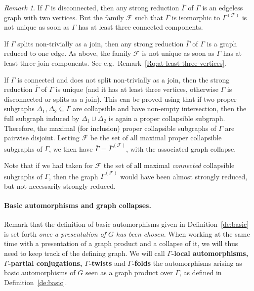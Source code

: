 \documentclass[a4paper,english,11pt]{article}
\theoremstyle{definition}
\theoremstyle{remark}
\newtheorem{rk}[de]{Remark}
\newcommand{\calf}{\mathcal{F}}
\newcommand{\deffont}[1]{\textbf{#1}}
\begin{document}
\begin{rk}\label{Rq:strong-reduction-as-at-least-3-vertices}\label{Rq:Unicite-des-reductions}
If $\Gamma$ is disconnected, then any strong reduction $\overline\Gamma$ of $\Gamma$ is an edgeless graph with two vertices. But the family $\mathcal{F}$ such that $\overline{\Gamma}$ is isomorphic to $\Gamma^{(\mathcal{F})}$ is not unique
as soon as $\Gamma$ has at least three connected components.

If $\Gamma$ splits non-trivially as a join, then any strong reduction $\overline\Gamma$ of $\Gamma$ is a graph reduced to one edge. As above, the family $\mathcal{F}$
is not unique as soon as $\Gamma$ has at least three join components. See e.g.\ Remark~\ref{Rq:at-least-three-vertices}.

If $\Gamma$ is connected and does not split non-trivially as a join, then the strong reduction $\overline{\Gamma}$ of $\Gamma$ is unique (and it has at least three vertices, otherwise $\Gamma$ is disconnected or splits as a join). This can be proved using that if two proper subgraphs $\Delta_1,\Delta_2\subseteq\Gamma$ are collapsible and have non-empty intersection, then the full subgraph induced by $\Delta_1\cup\Delta_2$ is again a proper collapsible subgraph. Therefore, the maximal (for inclusion) {proper} collapsible subgraphs of $\Gamma$ are pairwise disjoint. Letting $\calf$ be the set of all maximal {proper} collapsible subgraphs of $\Gamma$, we then have $\overline{\Gamma}=\overline{\Gamma}^{(\calf)}$, with the associated graph collapse.

Note that if we had taken for $\calf$ the set of all maximal \emph{connected} collapsible subgraphs of $\Gamma$, then the graph $\overline{\Gamma}^{(\calf)}$ would have been almost strongly reduced, but not necessarily strongly reduced.
\end{rk}

\paragraph*{Basic automorphisms and graph collapses.} Remark that the definition of basic automorphisms given in Definition~\ref{de:basic} is set forth \emph{once a presentation of $G$ has been chosen}. When working at the same time with a presentation of a graph product and a collapse of it, we will thus need to keep track of the defining graph. We will call \deffont{$\Gamma$-local automorphisms, $\Gamma$-partial conjugations, $\Gamma$-twists} and \deffont{$\Gamma$-folds} the automorphisms arising as basic automorphisms of $G$ seen as a graph product over $\Gamma$, as defined in Definition~\ref{de:basic}.
\end{document}

